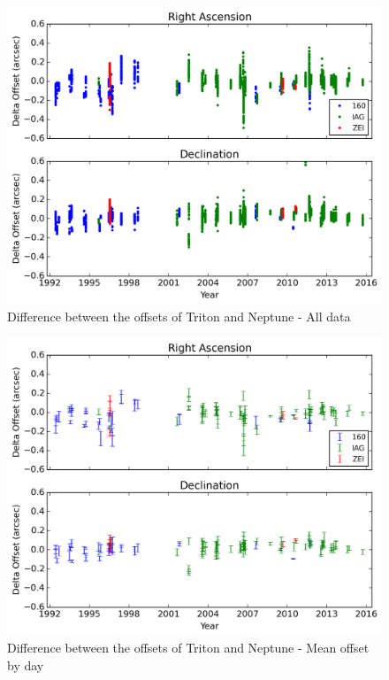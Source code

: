 \documentclass[12pt,a4paper]{report}
\begin{document}
\begin{figure}
\includegraphics[width=16.0cm]{Triton-Netuno_all.png} 
\caption{Difference between the offsets of Triton and Neptune - All data}
\label{Fig:triton-netuno-all}
\end{figure}
\begin{figure}
\includegraphics[width=16.0cm]{Triton-Netuno_media.png} 
\caption{Difference between the offsets of Triton and Neptune - Mean offset by day}
\label{Fig:triton-netuno-mean}
\end{figure}
\end{document}
